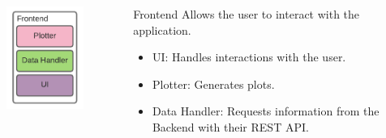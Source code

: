 \begin{frame}
    \begin{columns}[T]
        \begin{column}{.48\textwidth}
            \begin{figure}[H]
                \includegraphics[width=\textwidth]{images/systemmodel_frontend.pdf}
                \label{fig:frontendmodel}
            \end{figure}
        \end{column}
        \hfill
        \begin{column}{.48\textwidth}
            \begin{block}{Frontend}
                Allows the user to interact with the application.
            \end{block}
            \begin{itemize}
                \item<2-> UI:\newline{} Handles interactions with the user.
                \item<3-> Plotter:\newline{} Generates plots.
                \item<4-> Data Handler:\newline{} Requests information from the Backend with their REST API.
            \end{itemize}
        \end{column}
    \end{columns}
\end{frame}


